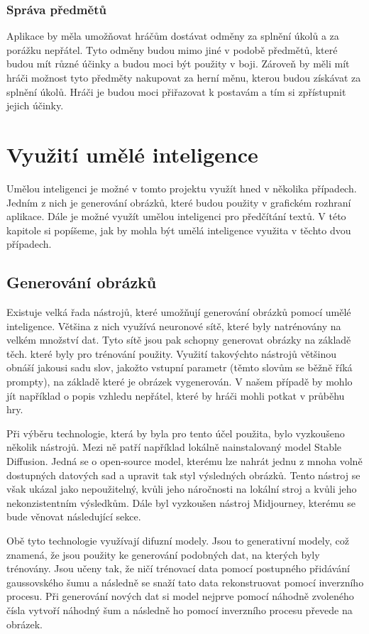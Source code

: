 \subsubsection*{Správa předmětů}
Aplikace by měla umožňovat hráčům dostávat odměny za splnění úkolů a za porážku nepřátel. Tyto odměny budou mimo jiné v podobě předmětů, které budou mít různé účinky a budou moci být použity v boji. Zároveň by měli mít hráči možnost tyto předměty nakupovat za herní měnu, kterou budou získávat za splnění úkolů. Hráči je budou moci přiřazovat k postavám a tím si zpřístupnit jejich účinky.

\section{Využití umělé inteligence}
Umělou inteligenci je možné v tomto projektu využít hned v několika případech. Jedním z nich je generování obrázků, které budou použity v grafickém rozhraní aplikace. Dále je možné využít umělou inteligenci pro předčítání textů. V této kapitole si popíšeme, jak by mohla být umělá inteligence využita v těchto dvou případech.

\subsection{Generování obrázků}\label{sec:generovani_obrazku}
Existuje velká řada nástrojů, které umožňují generování obrázků pomocí umělé inteligence. Většina z nich využívá neuronové sítě, které byly natrénovány na velkém množství dat. Tyto sítě jsou pak schopny generovat obrázky na základě těch. které byly pro trénování použity. Využití takovýchto nástrojů většinou obnáší jakousi sadu slov, jakožto vstupní parametr (těmto slovům se běžně říká prompty), na základě které je obrázek vygenerován. V našem případě by mohlo jít například o popis vzhledu nepřátel, které by hráči mohli potkat v průběhu hry.

Při výběru technologie, která by byla pro tento účel použita, bylo vyzkoušeno několik nástrojů. Mezi ně patří například lokálně nainstalovaný model Stable Diffusion\cite{stability_ai}. Jedná se o open-source model, kterému lze nahrát jednu z mnoha volně dostupných datových sad a upravit tak styl výsledných obrázků. Tento nástroj se však ukázal jako nepoužitelný, kvůli jeho náročnosti na lokální stroj a kvůli jeho nekonzistentním výsledkům. Dále byl vyzkoušen nástroj Midjourney\cite*{midjourney}, kterému se bude věnovat následující sekce.

Obě tyto technologie využívají difuzní modely. Jsou to generativní modely, což znamená, že jsou použity ke generování podobných dat, na kterých byly trénovány. Jsou učeny tak, že ničí trénovací data pomocí postupného přidávání gaussovského šumu a následně se snaží tato data rekonstruovat pomocí inverzního procesu. Při generování nových dat si model nejprve pomocí náhodně zvoleného čísla vytvoří náhodný šum a následně ho pomocí inverzního procesu převede na obrázek.
\pagebreak


